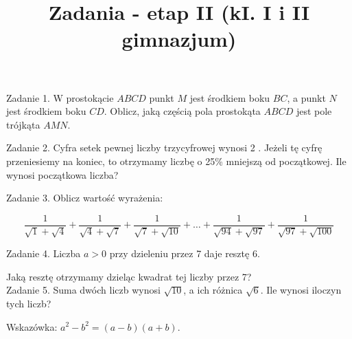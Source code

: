\documentclass[10pt]{article}
\title{Zadania - etap II (kI. I i II gimnazjum) }
\author{}
\date{}
\begin{document}
\maketitle
Zadanie 1. W prostokącie \(A B C D\) punkt \(M\) jest środkiem boku \(B C\), a punkt \(N\) jest środkiem boku \(C D\). Oblicz, jaką częścią pola prostokąta \(A B C D\) jest pole trójkąta \(A M N\).

Zadanie 2. Cyfra setek pewnej liczby trzycyfrowej wynosi 2 . Jeżeli tę cyfrę przeniesiemy na koniec, to otrzymamy liczbę o 25\% mniejszą od początkowej. Ile wynosi początkowa liczba?

Zadanie 3. Oblicz wartość wyrażenia:

\[
\frac{1}{\sqrt{1}+\sqrt{4}}+\frac{1}{\sqrt{4}+\sqrt{7}}+\frac{1}{\sqrt{7}+\sqrt{10}}+\ldots+\frac{1}{\sqrt{94}+\sqrt{97}}+\frac{1}{\sqrt{97}+\sqrt{100}}
\]

Zadanie 4. Liczba \(a>0\) przy dzieleniu przez 7 daje resztę 6.

Jaką resztę otrzymamy dzieląc kwadrat tej liczby przez 7?\\
Zadanie 5. Suma dwóch liczb wynosi \(\sqrt{10}\), a ich różnica \(\sqrt{6}\). Ile wynosi iloczyn tych liczb?

Wskazówka: \(a^{2}-b^{2}=(a-b)(a+b)\).
\end{document}
